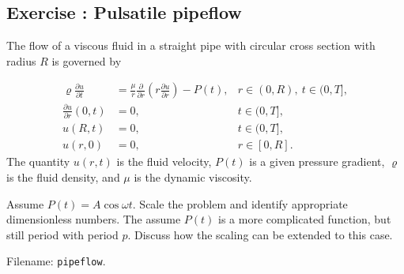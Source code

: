 \documentclass[graybox,envcountchap,sectrefs,final]{svmonodo}
\newcounter{doconce:movie:counter}
\newenvironment{doconceexercise}{}{}
\newcounter{doconceexercisecounter}
\begin{document}
\begin{doconceexercise}

\subsection*{Exercise \thedoconceexercisecounter: Pulsatile pipeflow}

\label{scale:exer:pipeflow:pulsatile}

The flow of a viscous fluid in a straight pipe with circular
cross section with radius $R$ is governed by

\begin{align}
\varrho\frac{\partial u}{\partial t} &= \frac{\mu}{r}\frac{\partial}{\partial r}
\left(r\frac{\partial u}{\partial r}\right) - P(t), & r\in (0,R),\ t\in (0,T],\\ 
\frac{\partial u}{\partial r}(0,t) &= 0, & t\in (0,T],\\ 
u(R,t) &= 0, & t\in (0,T],\\ 
u(r,0) &= 0, & r\in [0,R].
\end{align}
The quantity $u(r,t)$ is the fluid velocity, $P(t)$ is a given
pressure gradient, $\varrho$ is the fluid density, and $\mu$ is the
dynamic viscosity.

Assume $P(t) = A\cos\omega t$. Scale the problem and identify
appropriate dimensionless numbers. The assume $P(t)$ is a more
complicated function, but still period with period $p$.
Discuss how the scaling can be extended to this case.


\noindent Filename: \texttt{pipeflow}.

\end{doconceexercise}
\end{document}
